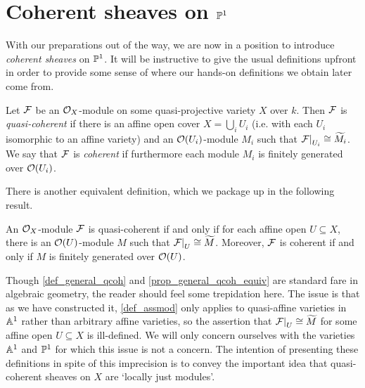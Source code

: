 \section{Coherent sheaves on $\mathbb{P}^{{1}}$}
\label{sect_coh_sheaves_p1}

With our preparations out of the way, we are now in a position to
introduce \emph{coherent sheaves} on $\mathbb{P}^{{1}}$.
It will be instructive to give the usual definitions upfront in order
to provide some sense of where our hands-on definitions we obtain
later come from.

\begin{definition}
  \label{def_general_qcoh}
  Let $\mathcal{F}$ be an $\mathcal{O}_{{X}}$-module on some quasi-projective
  variety $X$ over $k$.
  Then $\mathcal{F}$ is \emph{quasi-coherent} if there is an affine open
  cover $X = \bigcup_i U_i$ (i.e. with each $U_i$ isomorphic to an
  affine variety) and an $\mathcal{O}(U_i)$-module $M_i$ such that
  $\setres{\shf{F}}{U_i} \cong \assmod{M_i}$.
  We say that $\mathcal{F}$ is \emph{coherent} if furthermore each module
  $M_i$ is finitely generated over $\mathcal{O}(U_i)$.
\end{definition}

There is another equivalent definition, which we package up in the
following result.

\begin{proposition}
  \label{prop_general_qcoh_equiv}
  An $\mathcal{O}_{{X}}$-module $\mathcal{F}$ is quasi-coherent if and only if
  for each affine open $U \subseteq X$, there is an
  $\mathcal{O}(U)$-module $M$ such that $\setres{\shf{F}}{U} \cong \assmod{M}$.
  Moreover, $\mathcal{F}$ is coherent if and only if $M$ is finitely
  generated over $\mathcal{O}(U)$.
\end{proposition}

Though \cref{def_general_qcoh} and \cref{prop_general_qcoh_equiv} are
standard fare in algebraic geometry, the reader should feel some
trepidation here.
The issue is that as we have constructed it, \cref{def_assmod} only
applies to quasi-affine varieties in $\mathbb{A}^{{1}}$ rather than arbitrary
affine varieties, so the assertion that $\setres{\shf{F}}{U} \cong
\assmod{M}$ for some affine open $U \subseteq X$ is ill-defined.
We will only concern ourselves with the varieties $\mathbb{A}^{{1}}$ and
$\mathbb{P}^{{1}}$ for which this issue is not a concern.
The intention of presenting these definitions in spite of this
imprecision is to convey the important idea that quasi-coherent
sheaves on $X$ are `locally just modules'.

